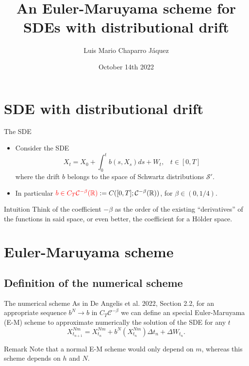 \documentclass{beamer}
\title{An Euler-Maruyama scheme for SDEs with distributional drift}
\author{Luis Mario Chaparro Jáquez}
\institute{University of Leeds\\School of Mathematics}
\date{October 14th 2022}
\begin{document}
\frame{\titlepage}
\frame{\tableofcontents}
\section{SDE with distributional drift}
\begin{frame}{The SDE}
	\begin{itemize}
	    \item
			Consider the SDE
			\begin{equation*}
				X_{t} = X_{0} + \int_{0}^{t} b(s, X_{s}) ds + W_{t},\,\,\,\,\,t \in [0, T]
			\end{equation*}
			where the drift
			$ b $
			belongs to the space of Schwartz distributions
			$ \mathcal{S}' $.
		\item
			In particular
			$ {\color{red}b \in C_T \mathcal{C}^{-\beta}(\mathbb{R})} := C([0, T];\mathcal{C}^{-\beta}(\mathbb{R})) $,
			for
			$ \beta \in (0, 1/4) $.
	\end{itemize}

	\begin{block}{Intuition}
	    Think of the coefficient
		$ -\beta $
		as the order of the existing ``derivatives'' of the functions in said space, or even better, the coefficient for a Hölder space.
	\end{block}
\end{frame}

\section{Euler-Maruyama scheme}
\subsection{Definition of the numerical scheme}
\begin{frame}{The numerical scheme}
	As in
	{\color{blue}De Angelis et al. 2022, Section 2.2},
	for an appropriate sequence
	$ b^{N} \to b $
	in
	$ C_T \mathcal{C}^{-\beta} $
	we can define an special Euler-Maruyama (E-M) scheme to approximate numerically the solution of the SDE for any
	$ t $
	\begin{equation*}
	    \label{eq:em_approx}
	    X^{Nm}_{t_{n+1}} 
		= 
	    X^{Nm}_{t_{n}} 
		+ 
		b^{N}\left(X^{Nm}_{t_{n}}\right) \Delta t_{n}
		+ 
		\Delta W_{t_{n}}
		.
	\end{equation*}

	\begin{block}{Remark}
	    Note that a normal E-M scheme would only depend on 
		$ m $,
		whereas this scheme depends on
		$ h $
		and
		$ N $.
	\end{block}
\end{frame}
\end{document}
